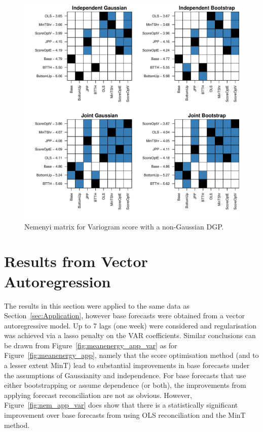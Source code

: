 \documentclass[a4paper,12pt]{article}
\theoremstyle{definition}
\begin{document}
\begin{figure}[!htb]
	\centering
	\includegraphics[height=.4\textheight]{Figs/nsv.pdf}
	\caption{Nemenyi matrix for Variogram score with a non-Gaussian DGP.}
	\label{fig:nsv}
\end{figure}

\clearpage

\section{Results from Vector Autoregression}\label{app:var}

The results in this section were applied to the same data as Section~\ref{sec:Application}, however base forecasts were obtained from a vector autoregressive model.  Up to 7 lags (one week) were considered and regularisation was achieved via a lasso penalty on the VAR coefficients.  Similar conclusions can be drawn from Figure~\ref{fig:meanenergy_app_var} as for Figure~\ref{fig:meanenergy_app}, namely that the score optimisation method (and to a lesser extent MinT) lead to substantial improvements in base forecasts under the assumptions of Gaussianity and independence.  For base forecasts that use either bootstrapping or assume dependence (or both), the improvements from applying forecast reconciliation are not as obvious.  However, Figure~\ref{fig:nem_app_var} does show that there is a statistically significant improvement over base forecasts from using OLS reconciliation and the MinT method.
\end{document}
